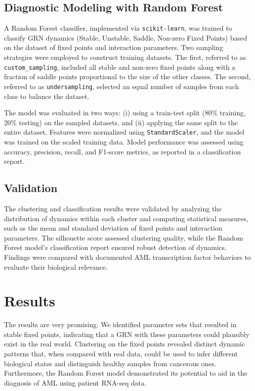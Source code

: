 \documentclass[a4paper,12pt]{article}
\begin{document}
\subsection{Diagnostic Modeling with Random Forest}
\label{subsec:diagnostic_modeling}
A Random Forest classifier, implemented via \texttt{scikit-learn}, was trained to classify GRN dynamics (Stable, Unstable, Saddle, Non-zero Fixed Points) based on the dataset of fixed points and interaction parameters. Two sampling strategies were employed to construct training datasets. The first, referred to as \texttt{custom\_sampling}, included all stable and non-zero fixed points along with a fraction of saddle points proportional to the size of the other classes. The second, referred to as \texttt{undersampling}, selected an equal number of samples from each class to balance the dataset. 

The model was evaluated in two ways: (i) using a train-test split (80\% training, 20\% testing) on the sampled datasets, and (ii) applying the same split to the entire dataset. Features were normalized using \texttt{StandardScaler}, and the model was trained on the scaled training data. Model performance was assessed using accuracy, precision, recall, and F1-score metrics, as reported in a classification report.


\subsection{Validation}
\label{subsec:validation}
The clustering and classification results were validated by analyzing the distribution of dynamics within each cluster and computing statistical measures, such as the mean and standard deviation of fixed points and interaction parameters. The silhouette score assessed clustering quality, while the Random Forest model’s classification report ensured robust detection of dynamics. Findings were compared with documented AML transcription factor behaviors to evaluate their biological relevance.


\section{Results}
\label{sec:results}
The results are very promising. We identified parameter sets that resulted in stable fixed points, indicating that a GRN with these parameters could plausibly exist in the real world. Clustering on the fixed points revealed distinct dynamic patterns that, when compared with real data, could be used to infer different biological states and distinguish healthy samples from cancerous ones. Furthermore, the Random Forest model demonstrated its potential to aid in the diagnosis of AML using patient RNA-seq data.
\end{document}
